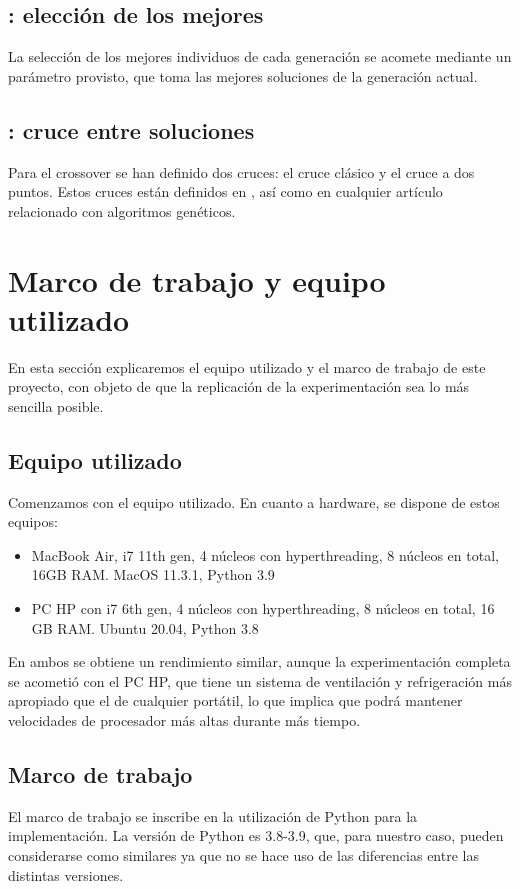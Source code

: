 \subsection{: elección de los mejores}
La selección de los mejores individuos de cada generación se acomete mediante un parámetro  provisto, que toma las  mejores soluciones de la generación actual.

\subsection{: cruce entre soluciones}
Para el crossover se han definido dos cruces: el cruce clásico y el cruce a dos puntos. Estos cruces están definidos en \cite{handbookMart}, así como en cualquier artículo relacionado con algoritmos genéticos.

\section{Marco de trabajo y equipo utilizado}
En esta sección explicaremos el equipo utilizado y el marco de trabajo de este proyecto, con objeto de que la replicación de la experimentación sea lo más sencilla posible.

\subsection{Equipo utilizado}
Comenzamos con el equipo utilizado. En cuanto a hardware, se dispone de estos equipos:

\begin{itemize}
    \item MacBook Air, i7 11th gen, 4 núcleos con hyperthreading, 8 núcleos en total, 16GB RAM. MacOS 11.3.1, Python 3.9
    \item PC HP con i7 6th gen, 4 núcleos con hyperthreading, 8 núcleos en total, 16 GB RAM. Ubuntu 20.04, Python 3.8
\end{itemize}

En ambos se obtiene un rendimiento similar, aunque la experimentación completa se acometió con el PC HP, que tiene un sistema de ventilación y refrigeración más apropiado que el de cualquier portátil, lo que implica que podrá mantener velocidades de procesador más altas durante más tiempo.

\subsection{Marco de trabajo}
El marco de trabajo se inscribe en la utilización de Python para la implementación. La versión de Python es 3.8-3.9, que, para nuestro caso, pueden considerarse como similares ya que no se hace uso de las diferencias entre las distintas versiones.

